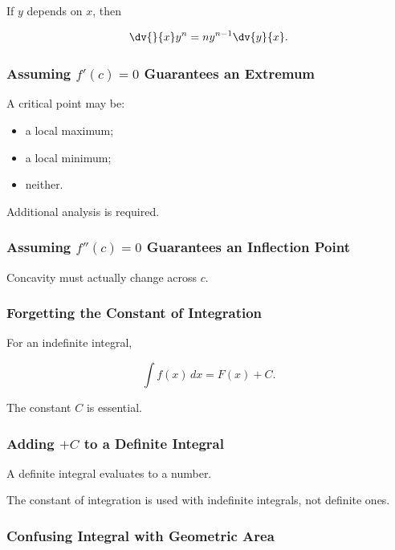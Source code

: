 If \(y\) depends on \(x\), then

\[ \dv{}{x}y^n
=ny^{n-1}\dv{y}{x}. \]

\subsubsection{Assuming \(f'(c)=0\) Guarantees an Extremum}

A critical point may be:

\begin{itemize}
    \item a local maximum;
    \item a local minimum;
    \item neither.
\end{itemize}

Additional analysis is required.

\subsubsection{Assuming \(f''(c)=0\) Guarantees an Inflection Point}

Concavity must actually change across \(c\).

\subsubsection{Forgetting the Constant of Integration}

For an indefinite integral,

\[ \int f(x)\,dx=F(x)+C. \]

The constant \(C\) is essential.

\subsubsection{Adding \(+C\) to a Definite Integral}

A definite integral evaluates to a number.

The constant of integration is used with indefinite integrals, not definite
ones.

\subsubsection{Confusing Integral with Geometric Area}

